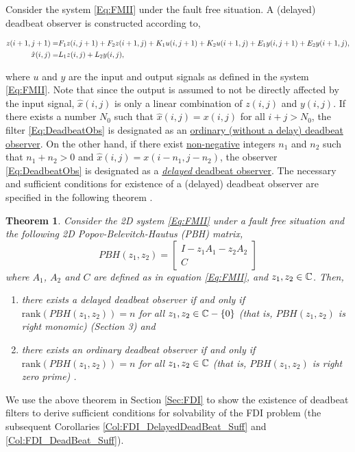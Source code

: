 \documentclass[journal,12pt,draftcls,onecolumn]{IEEEtran}
\newcommand{\bbm}{\begin{bmatrix}}
\newcommand{\ebm}{\end{bmatrix}}
\newcommand{\bs}{\begin{small}}
\newcommand{\es}{\end{small}}
\newcommand{\rank}{\mathrm{rank}}
\def\QEDclosed{\hfill\IEEEQEDclosed}
\renewcommand{\qed}{\QEDclosed}
\newtheorem{theorem}{Theorem}
\begin{document}
Consider the system \eqref{Eq:FMII} under the fault free situation. A (delayed) deadbeat observer is constructed according to,
\bs
\begin{align}\label{Eq:DeadbeatObs}
	z(i+1,j+1) =& F_1z(i,j+1) + F_2z(i+1,j)+ K_1u(i,j+1) + K_2u(i+1,j) + E_1y(i,j+1) + E_2y(i+1,j),\notag\\
	\hat{x}(i,j) =& L_1z(i,j)+L_2y(i,j),
\end{align}
\es
where $u$ and $y$ are the input and output signals as defined in the system \eqref{Eq:FMII}. Note that since  the output is assumed to not be directly affected by the input signal, $\hat{x}(i,j)$ is only a linear combination of $z(i,j)$ and $y(i,j)$.  If there exists a number $N_0$ such that $\hat{x}(i,j)=x(i,j)$ for all $i+j>N_0$, the filter \eqref{Eq:DeadbeatObs} is designated as an \underline{ordinary (without a delay) deadbeat observer}. On the other hand, if there exist \underline{non-negative} integers $n_1$ and $n_2$ such that $n_1+n_2>0 $ and $\hat{x}(i,j)=x(i-n_1,j-n_2)$, the observer \eqref{Eq:DeadbeatObs} is  designated as a \underline{{\it delayed} deadbeat observer}. The necessary and sufficient conditions for existence of a (delayed) deadbeat observer are specified in the following theorem \cite{Bisiacco_Obs, BisiaccoLetter}.
\begin{theorem}\label{Thm:DeadbeatObsExistance}
	Consider the 2D system \eqref{Eq:FMII} under a fault free situation and the following 2D Popov-Belevitch-Hautus (PBH)  matrix,
	\begin{equation}\label{Eq:PBHMatrix}
		PBH(z_1,z_2) = \bbm I-z_1A_1-z_2A_2\\ C\ebm
	\end{equation}
	where $A_1$, $A_2$ and $C$ are defined as in equation \eqref{Eq:FMII}, and $z_1,z_2\in\mathbb{C}$. Then,
	\begin{enumerate}
		\renewcommand{\labelenumi}{(\roman{enumi})}
		\item there exists a delayed  deadbeat observer if and only if $\rank(PBH(z_1,z_2))=n$ for all $z_1,z_2\in\mathbb{C}-\{0\}$ (that is, $PBH(z_1,z_2)$ is right monomic) \cite{BisiaccoLetter} (Section 3) and
		\item there exists an ordinary deadbeat observer if and only if $\rank(PBH(z_1,z_2))=n$ for all $z_1,z_2\in\mathbb{C}$ (that is, $PBH(z_1,z_2)$ is right zero prime) \cite{Bisiacco_Obs}.\qed
	\end{enumerate}
\end{theorem}
We use the above theorem in Section \ref{Sec:FDI} to show the existence of deadbeat filters to derive sufficient conditions for solvability of the FDI problem (the subsequent Corollaries \ref{Col:FDI_DelayedDeadBeat_Suff} and \ref{Col:FDI_DeadBeat_Suff}).
\end{document}

